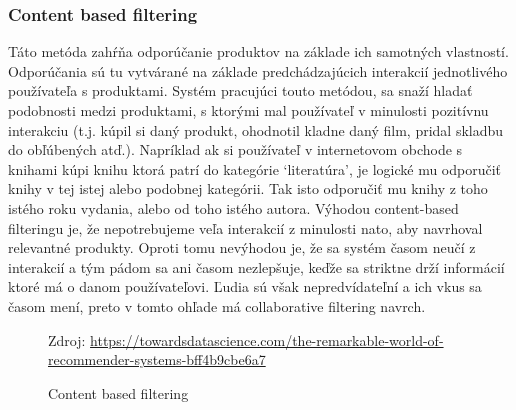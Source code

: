 \subsubsection{Content based filtering}
Táto metóda zahŕňa odporúčanie produktov na základe ich samotných vlastností. Odporúčania sú tu vytvárané na základe predchádzajúcich interakcií jednotlivého používateľa s produktami. Systém pracujúci touto metódou, sa snaží hladať podobnosti medzi produktami, s ktorými mal používateľ v minulosti pozitívnu interakciu (t.j. kúpil si daný produkt, ohodnotil kladne daný film, pridal skladbu do obľúbených atď.). Napríklad ak si používateľ v internetovom obchode s knihami kúpi knihu ktorá patrí do kategórie ‘literatúra’, je logické mu odporučiť knihy v tej istej alebo podobnej kategórii. Tak isto odporučiť mu knihy z toho istého roku vydania, alebo od toho istého autora. Výhodou content-based filteringu je, že nepotrebujeme veľa interakcií z minulosti nato, aby navrhoval relevantné produkty. Oproti tomu nevýhodou je, že sa systém časom neučí z interakcií a tým pádom sa ani časom nezlepšuje, keďže sa striktne drží informácií ktoré má o danom používateľovi. Ľudia sú však nepredvídateľní a ich vkus sa časom mení, preto v tomto ohľade má collaborative filtering navrch.
\begin{figure}[!htbp]
  \centering  
  \def\stackalignment{c}
           {\scriptsize%
            Zdroj: \url{https://towardsdatascience.com/the-remarkable-world-of-recommender-systems-bff4b9cbe6a7}}
  \caption{Content based filtering}
  
  \label{contentFiltering}
\end{figure}	

